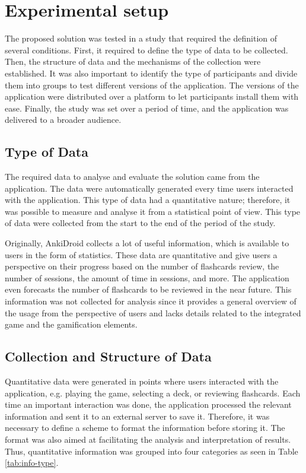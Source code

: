 
\chapter{Experimental setup} %

\label{expe} %


The proposed solution was tested in a study that required the definition of several conditions. First, it required to define the type of data to be collected. Then, the structure of data and the mechanisms of the collection were established. It was also important to identify the type of participants and divide them into groups to test different versions of the application. The versions of the application were distributed over a platform to let participants install them with ease. Finally, the study was set over a period of time, and the application was delivered to a broader audience.

\section{Type of Data}
The required data to analyse and evaluate the solution came from the application. The data were automatically generated every time users interacted with the application. This type of data had a quantitative nature; therefore, it was possible to measure and analyse it from a statistical point of view. This type of data were collected from the start to the end of the period of the study.

Originally, AnkiDroid collects a lot of useful information, which is available to users in the form of statistics. These data are quantitative and give users a perspective on their progress based on the number of flashcards review, the number of sessions, the amount of time in sessions, and more. The application even forecasts the number of flashcards to be reviewed in the near future. This information was not collected for analysis since it provides a general overview of the usage from the perspective of users and lacks details related to the integrated game and the gamification elements.

\section{Collection and Structure of Data}
Quantitative data were generated in points where users interacted with the application, e.g. playing the game, selecting a deck, or reviewing flashcards. Each time an important interaction was done, the application processed the relevant information and sent it to an external server to save it. Therefore, it was necessary to define a scheme to format the information before storing it. The format was also aimed at facilitating the analysis and interpretation of results. Thus, quantitative information was grouped into four categories as seen in Table \ref{tab:info-type}.

